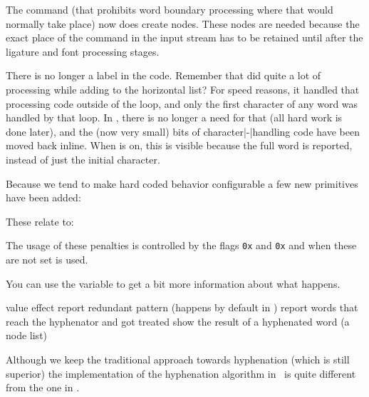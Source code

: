 \startitem
    The \type {\noboundary} command (that prohibits word boundary processing
    where that would normally take place) now does create nodes. These nodes are
    needed because the exact place of the \type {\noboundary} command in the
    input stream has to be retained until after the ligature and font processing
    stages.
\stopitem

\startitem
    There is no longer a  label in the code. Remember that
     did quite a lot of processing while adding  to the
    horizontal list? For speed reasons, it handled that processing code outside
    of the  loop, and only the first character of any \quote
    {word} was handled by that  loop. In \LUATEX, there is
    no longer a need for that (all hard work is done later), and the (now very
    small) bits of character|-|handling code have been moved back inline. When
    \type {\tracingcommands} is on, this is visible because the full word is
    reported, instead of just the initial character.
\stopitem

\stopitemize

Because we tend to make hard coded behavior configurable a few new primitives
have been added:

\starttyping
\automatichyphenpenalty
\explicithyphenpenalty
\stoptyping

These relate to:

\starttyping
\automaticdiscretionary %
\explicitdiscretionary  %
\stoptyping

The usage of these penalties is controlled by the \type {\hyphenationmode} flags
{\tt0x\tohexadecimal\automaticpenaltyhyphenationcode } and
{\tt0x\tohexadecimal\explicitpenaltyhyphenationcode} and when these are not set \typ
{\exhyphenpenalty} is used.

You can use the \type {\tracinghyphenation} variable to get a bit more information
about what happens.

\starttabulate[|lT|l|]
\FL
\BC value \BC effect \NC\NR
\TL
{}     \NC report redundant pattern (happens by default in \LUATEX) \NC\NR
{}     \NC report words that reach the hyphenator and got treated \NC\NR
{}     \NC show the result of a hyphenated word (a node list) \NC\NR
\LL
\stoptabulate

\stopsection

\startsection[title={Loading patterns and exceptions},reference=patternsexceptions]

Although we keep the traditional approach towards hyphenation (which is still
superior) the implementation of the hyphenation algorithm in \LUATEX\ is quite
different from the one in .

